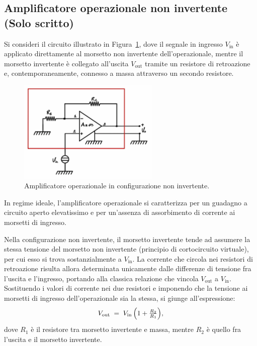 \subsection{Amplificatore operazionale non invertente (Solo scritto)}

Si consideri il circuito illustrato in Figura~\ref{fig:non_inverting_amp}, dove il segnale in ingresso \(V_{\text{in}}\) è applicato direttamente al morsetto non invertente dell’operazionale, mentre il morsetto invertente è collegato all’uscita \(V_{\text{out}}\) tramite un resistore di retroazione e, contemporaneamente, connesso a massa attraverso un secondo resistore.\\[2mm]
\begin{figure}[H]
    \centering
    \includegraphics[width=0.6\textwidth]{images/1.2.2.1.png}
    \caption{Amplificatore operazionale in configurazione non invertente.}
    \label{fig:non_inverting_amp}
\end{figure}

In regime ideale, l’amplificatore operazionale si caratterizza per un guadagno a circuito aperto elevatissimo e per un’assenza di assorbimento di corrente ai morsetti di ingresso. 

Nella configurazione non invertente, il morsetto invertente tende ad assumere la stessa tensione del morsetto non invertente (principio di cortocircuito virtuale), per cui esso si trova sostanzialmente a \(V_{\text{in}}\). La corrente che circola nei resistori di retroazione risulta allora determinata unicamente dalle differenze di tensione fra l’uscita e l’ingresso, portando alla classica relazione che vincola \(V_{\text{out}}\) a \(V_{\text{in}}\). Sostituendo i valori di corrente nei due resistori e imponendo che la tensione ai morsetti di ingresso dell’operazionale sia la stessa, si giunge all’espressione:
\[
    V_{\text{out}} \;=\; V_{\text{in}} 
    \,\Bigl(1 + \tfrac{R_{2}}{R_{1}}\Bigr),
\]
dove \(R_{1}\) è il resistore tra morsetto invertente e massa, mentre \(R_{2}\) è quello fra l’uscita e il morsetto invertente.

